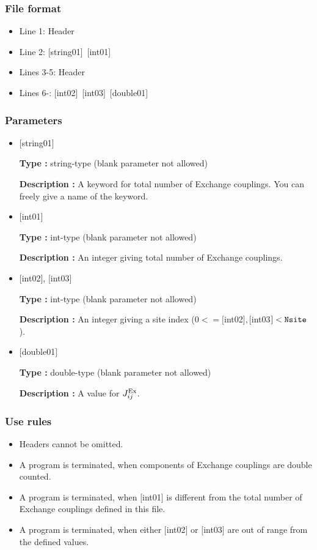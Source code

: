 \subsubsection{File format}
 \begin{itemize}
   \item  Line 1:  Header
   \item  Line 2:   [string01]~[int01]
   \item  Lines 3-5:  Header
   \item  Lines 6-: 
   [int02]~[int03]~[double01] 
  \end{itemize}
\subsubsection{Parameters}
 \begin{itemize}

   \item  $[$string01$]$
   
    {\bf Type :} string-type (blank parameter not allowed)

   {\bf Description :}  A keyword for total number of Exchange couplings. You can freely give a name of the keyword.

   \item  $[$int01$]$
   
    {\bf Type :} int-type (blank parameter not allowed)

   {\bf Description :} An integer giving total number of Exchange couplings.

  \item  $[$int02$]$, $[$int03$]$
  
 {\bf Type :} int-type (blank parameter not allowed)

{\bf Description :} An integer giving a site index ($0<= [$int02$], [$int03$]<\verb|Nsite|$).
 
 \item  $[$double01$]$
   
   {\bf Type :} double-type (blank parameter not allowed)

  {\bf Description :}   A value for $J_{ij}^{\rm Ex}$.
  
\end{itemize}

\subsubsection{Use rules}
\begin{itemize}
\item Headers cannot be omitted. 
\item A program is terminated, when components of Exchange couplings are double counted.
\item A program is terminated, when $[$int01$]$ is different from the total number of Exchange couplings defined in this file.
\item A program is terminated, when either $[$int02$]$ or $[$int03$]$ are out of range from the defined values.
\end{itemize}



